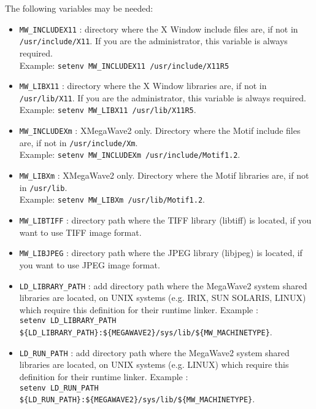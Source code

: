 The following variables may be needed:
\begin{itemize}
\item \verb+MW_INCLUDEX11+ : directory where the X Window include files are, if not in \verb+/usr/include/X11+. If you are the administrator, this variable is always required. \\
Example: \verb+setenv MW_INCLUDEX11 /usr/include/X11R5+
\item \verb+MW_LIBX11+  : directory where the X Window libraries are, if not in \verb+/usr/lib/X11+. 
If you are the administrator, this variable is always required.\\
Example: \verb+setenv MW_LIBX11 /usr/lib/X11R5+.
\item \verb+MW_INCLUDEXm+  : XMegaWave2 only. 
Directory where the Motif include files are, if not in \verb+/usr/include/Xm+. \\
Example: \verb+setenv MW_INCLUDEXm /usr/include/Motif1.2+.
\item \verb+MW_LIBXm+  : XMegaWave2 only. 
Directory where the Motif libraries are, if not in \verb+/usr/lib+.  \\
Example: \verb+setenv MW_LIBXm /usr/lib/Motif1.2+.
\item \verb+MW_LIBTIFF+  : directory path where the TIFF library 
(libtiff) is located, if you want to use TIFF image format.
\item \verb+MW_LIBJPEG+  : directory path where the JPEG library (libjpeg) is located, if you want to use JPEG image format.
\item \verb+LD_LIBRARY_PATH+  : add directory path where the MegaWave2 system shared libraries are located, on UNIX 
systems (e.g. IRIX, SUN SOLARIS, LINUX) which require this definition for their runtime linker.  Example :\\
\verb+setenv LD_LIBRARY_PATH ${LD_LIBRARY_PATH}:${MEGAWAVE2}/sys/lib/${MW_MACHINETYPE}+.
\item \verb+LD_RUN_PATH+ : 
add directory path where the MegaWave2 system shared libraries are located, on UNIX 
systems (e.g. LINUX) which require this definition for their runtime linker.  Example :\\
\verb+setenv LD_RUN_PATH ${LD_RUN_PATH}:${MEGAWAVE2}/sys/lib/${MW_MACHINETYPE}+.
\end{itemize}

